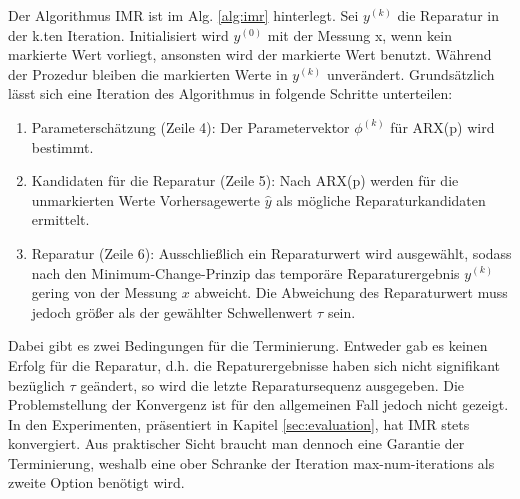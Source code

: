 Der Algorithmus IMR ist im Alg. \ref{alg:imr} hinterlegt.  Sei $y^{(k)}$ die
Reparatur in der k.ten Iteration. Initialisiert wird $y^{(0)}$ mit der Messung
x, wenn kein markierte Wert vorliegt, ansonsten wird der markierte Wert
benutzt. Während der Prozedur bleiben die markierten Werte in $y^{(k)}$
unverändert.  Grundsätzlich lässt sich eine Iteration des Algorithmus in
folgende Schritte unterteilen:
\begin{enumerate}
    \item Parameterschätzung (Zeile 4): Der Parametervektor $\phi^{(k)}$ für ARX(p) wird
bestimmt.
    \item Kandidaten für die Reparatur (Zeile 5): Nach ARX(p) werden für die unmarkierten
        Werte Vorhersagewerte $\hat{y}$ als mögliche Reparaturkandidaten ermittelt.
    \item Reparatur (Zeile 6): Ausschließlich ein Reparaturwert wird
        ausgewählt, sodass nach den Minimum-Change-Prinzip das temporäre
        Reparaturergebnis $y^{(k)}$ gering von der Messung $x$ abweicht. Die
        Abweichung des Reparaturwert muss jedoch größer als der gewählter
        Schwellenwert $\tau$ sein.
\end{enumerate}
Dabei gibt es zwei Bedingungen für die Terminierung. Entweder gab es keinen
Erfolg für die Reparatur, d.h. die Repaturergebnisse haben sich nicht
signifikant bezüglich $\tau$ geändert, so wird die letzte Reparatursequenz
ausgegeben. Die Problemstellung der Konvergenz ist für den allgemeinen Fall
jedoch nicht gezeigt. In den Experimenten, präsentiert in Kapitel
\ref{sec:evaluation}, hat IMR stets konvergiert. Aus praktischer Sicht braucht
man dennoch eine Garantie der Terminierung, weshalb eine ober Schranke der Iteration
max-num-iterations als zweite Option benötigt wird. 

